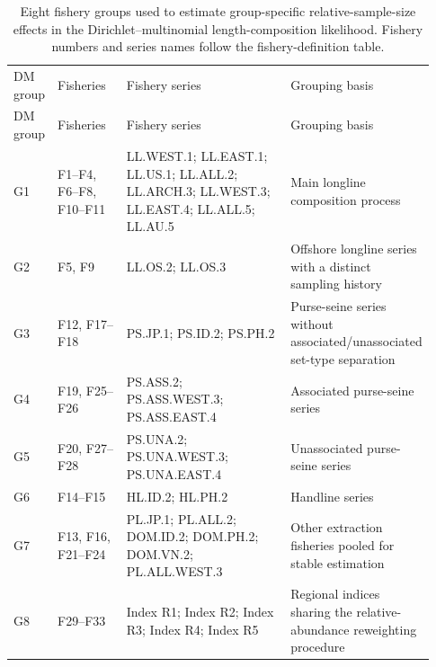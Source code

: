 \documentclass[
  english,
  a4paper,
  a4paper,
  11pt]{SCreport}
\begin{document}
\begin{landscape}
\begingroup
\scriptsize
\setlength{\tabcolsep}{3pt}
\renewcommand{\arraystretch}{1.04}

\begin{longtable}{@{}>{\raggedleft\arraybackslash}p{0.06\linewidth}>{\raggedright\arraybackslash}p{0.18\linewidth}>{\raggedright\arraybackslash}p{0.49\linewidth}>{\raggedright\arraybackslash}p{0.20\linewidth}@{}}

\caption{\label{tbl-dm-groups}Eight fishery groups used to estimate group-specific relative-sample-size effects in the Dirichlet--multinomial length-composition likelihood. Fishery numbers and series names follow the fishery-definition table.}

\tabularnewline

\\
\toprule
DM group & Fisheries & Fishery series & Grouping basis \\
\midrule
\endfirsthead
\toprule
DM group & Fisheries & Fishery series & Grouping basis \\
\midrule
\endhead
\bottomrule
\endlastfoot
G1 & F1--F4, F6--F8, F10--F11 & LL.WEST.1; LL.EAST.1; LL.US.1; LL.ALL.2; LL.ARCH.3; LL.WEST.3; LL.EAST.4; LL.ALL.5; LL.AU.5 & Main longline composition process \\
G2 & F5, F9 & LL.OS.2; LL.OS.3 & Offshore longline series with a distinct sampling history \\
G3 & F12, F17--F18 & PS.JP.1; PS.ID.2; PS.PH.2 & Purse-seine series without associated/unassociated set-type separation \\
G4 & F19, F25--F26 & PS.ASS.2; PS.ASS.WEST.3; PS.ASS.EAST.4 & Associated purse-seine series \\
G5 & F20, F27--F28 & PS.UNA.2; PS.UNA.WEST.3; PS.UNA.EAST.4 & Unassociated purse-seine series \\
G6 & F14--F15 & HL.ID.2; HL.PH.2 & Handline series \\
G7 & F13, F16, F21--F24 & PL.JP.1; PL.ALL.2; DOM.ID.2; DOM.PH.2; DOM.VN.2; PL.ALL.WEST.3 & Other extraction fisheries pooled for stable estimation \\
G8 & F29--F33 & Index R1; Index R2; Index R3; Index R4; Index R5 & Regional indices sharing the relative-abundance reweighting procedure \\

\end{longtable}

\endgroup
\end{landscape}
\end{document}
